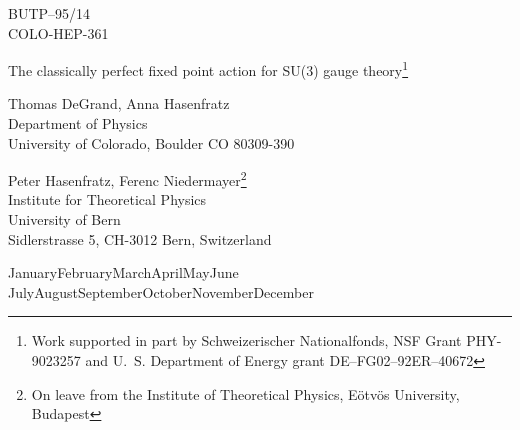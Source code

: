 
\newcommand{\bee}{\begin{equation}}
\newcommand{\ee}{\end{equation}}
\newcommand{\beea}{\begin{eqnarray}}
\newcommand{\eea}{\end{eqnarray}}
\newcommand{\rme}{{\rm e}}


\thispagestyle{empty}
\parskip=12pt
\raggedbottom

\def\mytoday#1{{ } \ifcase\month \or
 January\or February\or March\or April\or May\or June\or
 July\or August\or September\or October\or November\or December\fi
 \space \number\year}
\noindent
\hspace*{9cm} BUTP--95/14\\
\hspace*{9cm} COLO-HEP-361\\
\vspace*{1cm}
\begin{center}
{\LARGE The classically perfect fixed point action for SU(3) gauge 
theory}\footnote{Work supported in part by Schweizerischer Nationalfonds,
NSF Grant PHY-9023257 
and U.~S. Department of Energy grant DE--FG02--92ER--40672}

\vspace{1cm}

Thomas DeGrand,
Anna Hasenfratz \\
Department of Physics \\
 University of Colorado,
Boulder CO 80309-390 

\vspace{.5cm}

Peter Hasenfratz, 
Ferenc Niedermayer\footnote{On leave from the Institute of Theoretical
Physics, E\"otv\"os University, Budapest}
\\
Institute for Theoretical Physics \\
University of Bern \\
Sidlerstrasse 5, CH-3012 Bern, Switzerland

\vspace{0.5cm}


\mytoday \\ \vspace*{0.5cm}

\nopagebreak[4]

\begin{abstract}
In this paper (the first of a series) we describe the construction
of fixed point actions for lattice $SU(3)$ pure gauge theory.
Fixed point actions have scale invariant instanton solutions
and the spectrum of their quadratic part is exact (they are classical perfect
actions).
We argue that the fixed point action is even 1--loop quantum perfect,
i.e. in its physical predictions there are no $g^2 a^n$ cut--off 
effects for any $n$. 
We discuss the construction of fixed point operators and present
examples. The lowest order $q {\bar q}$ potential $V(\vec{r})$ obtained
from the fixed point Polyakov loop correlator is free
of any cut--off effects which go to zero  as an inverse
power of the distance $r$.
\end{abstract}

\end{center}
